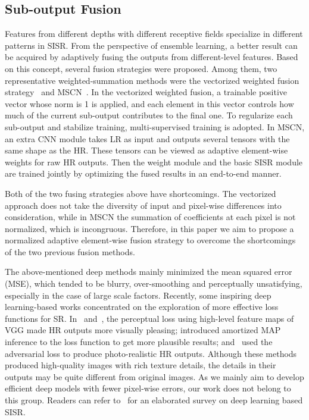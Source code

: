 \documentclass[journal]{IEEEtran}
\begin{document}
\subsection{Sub-output Fusion} 

Features from different depths with different receptive fields specialize in different patterns in SISR. From the perspective of ensemble learning, a better result can be acquired by adaptively fusing the outputs from different-level features. Based on this concept, several fusion strategies were proposed. Among them, two representative weighted-summation methods were the vectorized weighted fusion strategy~\cite{kim2016deeply,Tai-MemNet-2017} and MSCN~\cite{liu2016learning}. In the vectorized weighted fusion, a trainable positive vector whose  norm is 1 is applied, and each element in this vector controls how much of the current sub-output contributes to the final one. To regularize each sub-output and stabilize training, multi-supervised training is adopted. In MSCN, an extra CNN module takes LR as input and outputs several tensors with the same shape as the HR. These tensors can be viewed as adaptive element-wise weights for raw HR outputs. Then the weight module and the basic SISR module are trained jointly by optimizing the fused results in an end-to-end manner. 

Both of the two fusing strategies above have shortcomings. The vectorized approach does not take the diversity of input and pixel-wise differences into consideration, while in MSCN the summation of coefficients at each pixel is not normalized, which is incongruous. Therefore, in this paper we aim to propose a normalized adaptive element-wise fusion strategy to overcome the shortcomings of the two previous fusion methods. 

The above-mentioned deep methods mainly minimized the mean squared error (MSE), which tended to be blurry, over-smoothing and perceptually unsatisfying, especially in the case of large scale factors. Recently, some inspiring deep learning-based works concentrated on the exploration of more effective loss functions for SR. In~\cite{bruna2015super} and~\cite{johnson2016perceptual}, the perceptual loss using high-level feature maps of VGG made HR outputs more visually pleasing; \cite{sonderby2016amortised} introduced amortized MAP inference to the loss function to get more plausible results; \cite{ledig2016photo} and~\cite{sajjadi2016enhancenet} used the adversarial loss to produce photo-realistic HR outputs. Although these methods produced high-quality images with rich texture details, the details in their outputs may be quite different from original images. As we mainly aim to develop efficient deep models with fewer pixel-wise errors, our work does not belong to this group. Readers can refer to~\cite{yang2018deep} for an elaborated survey on deep learning based SISR.
\end{document}
